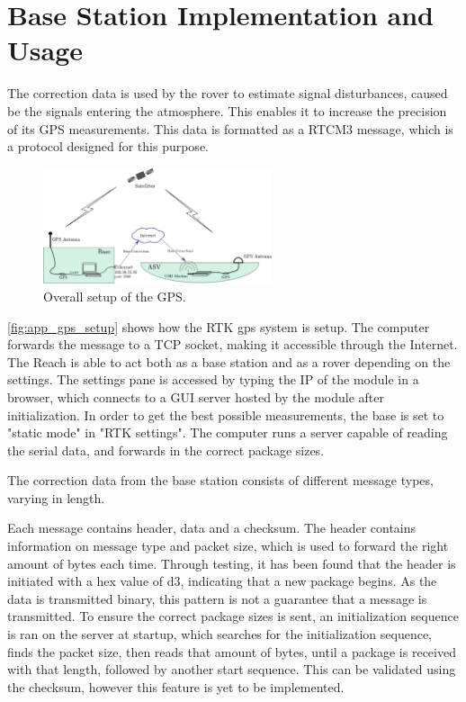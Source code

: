 \section*{Base Station Implementation and Usage}
The correction data is used by the rover to estimate signal disturbances, caused be the signals entering the atmosphere. 
This enables it to increase the precision of its GPS measurements. This data is formatted as a RTCM3 message, which is a protocol designed for this purpose.
\begin{figure}[H]
	\includegraphics[width=0.6\textwidth]{figures/comunicationSetup.pdf}
	\caption{Overall setup of the GPS.}
	\label{fig:app_gps_setup}
\end{figure}
\autoref{fig:app_gps_setup} shows how the RTK gps system is setup. 
The computer forwards the message to a TCP socket, making it accessible through the Internet. 
The Reach is able to act both as a base station and as a rover depending on the settings.
The settings pane is accessed by typing the IP of the module in a browser, which connects to a GUI server hosted by the module after initialization.
In order to get the best possible measurements, the base is set to "static mode" in "RTK settings".
The computer runs a server capable of reading the serial data, and forwards in the correct package sizes.

The correction data from the base station consists of different message types, varying in length.

Each message contains header, data and a checksum. The header contains information on message type and packet size, which is used to forward the right amount of bytes each time.
Through testing, it has been found that the header is initiated with a hex value of d3, indicating that a new package begins. As the data is transmitted binary, this pattern is not a guarantee that a message is transmitted. 
To ensure the correct package sizes is sent, an initialization sequence is ran on the server at startup, which searches for the initialization sequence, finds the packet size, then reads that amount of bytes, until a package is received with that length, followed by another start sequence.
This can be validated using the checksum, however this feature is yet to be implemented. 

